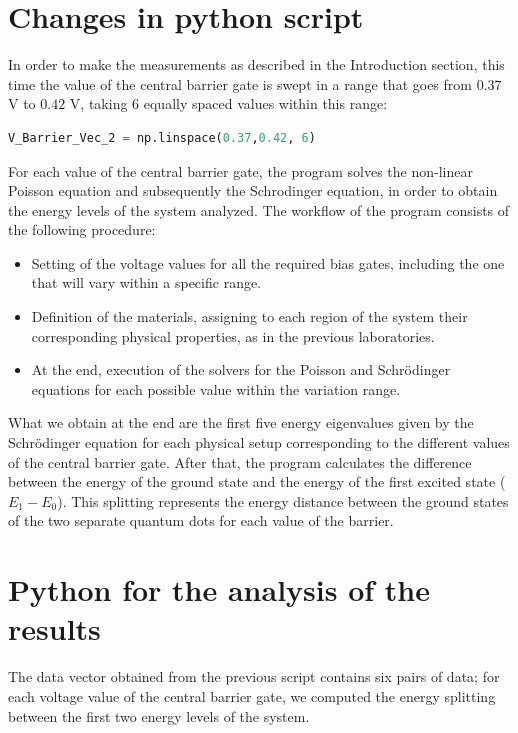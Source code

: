 \chapter{Changes in python script}
In order to make the measurements as described in the Introduction section, this time the value of the central barrier gate
is swept in a range that goes from $0.37$ V to $0.42$ V, taking 6 equally spaced values within this range:
\begin{lstlisting}[language=Python, label={init}, frame=single, framesep=8pt ]
    V_Barrier_Vec_2 = np.linspace(0.37,0.42, 6)
\end{lstlisting}
For each value of the central barrier gate, the program solves the non-linear Poisson equation and subsequently the Schrodinger equation, in order to obtain the energy levels of the system analyzed.
The workflow of the program consists of the following procedure:
\begin{itemize}
    \item Setting of the voltage values for all the required bias gates, including the one that will vary within a specific range.
    \item Definition of the materials, assigning to each region of the system their corresponding physical properties, as in the previous laboratories.
    \item At the end, execution of the solvers for the Poisson and Schrödinger equations for each possible value within the variation range.
\end{itemize}

What we obtain at the end are the first five energy eigenvalues given by the Schrödinger equation for each physical setup corresponding to the different values of the central barrier gate. After that, the program calculates the difference between the energy of the ground state and the energy of the first excited state ($E_1 - E_0$). This splitting represents the energy distance between the ground states of the two separate quantum dots for each value of the barrier.

\chapter{Python for the analysis of the results}

The data vector obtained from the previous script contains six pairs of data; for each voltage value of the central barrier gate, we computed the energy splitting between the first two energy levels of the system. 


